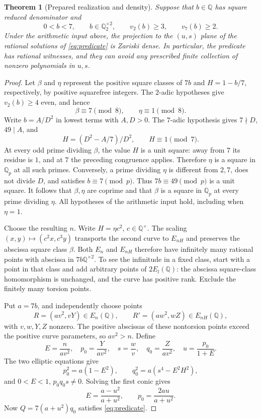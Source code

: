 \documentclass[11pt]{article}
\newtheorem{theorem}{Theorem}
\newcommand{\Q}{\mathbb Q}
\begin{document}
\begin{theorem}[Prepared realization and density]\label{thm:complete}
Suppose that $b\in\Q$ has square reduced denominator and
\[
 0<b<7,\qquad b\in\Q_2^{\times2},\qquad
 v_2(b)\ge3,\qquad v_7(b)\ge2.
\]
Under the arithmetic input above, the projection to the $(u,s)$ plane
of the rational solutions of \eqref{eq:predicate} is Zariski dense.
In particular, the predicate has rational witnesses, and they can
avoid any prescribed finite collection of nonzero polynomials in $u,s$.
\end{theorem}
\begin{proof}
Let $\beta$ and $\eta$ represent the positive square classes of $7b$
and $H=1-b/7$, respectively, by positive squarefree integers.
The $2$-adic hypotheses give $v_2(b)\ge4$ even, and hence
\[
 \beta\equiv7\pmod8,\qquad \eta\equiv1\pmod8.
\]
Write $b=A/D^2$ in lowest terms with $A,D>0$. The $7$-adic hypothesis
gives $7\nmid D$, $49\mid A$, and
\[
 H=(D^2-A/7)/D^2,\qquad H\equiv1\pmod7.
\]
At every odd prime dividing $\beta$, the value $H$ is a unit square:
away from $7$ its residue is $1$, and at $7$ the preceding congruence
applies. Therefore $\eta$ is a square in $\Q_p$ at all such primes.
Conversely, a prime dividing $\eta$ is different from $2,7$, does not
divide $D$, and satisfies $b\equiv7\pmod p$. Thus $7b\equiv49\pmod p$
is a unit square. It follows that $\beta,\eta$ are coprime and that
$\beta$ is a square in $\Q_p$ at every prime dividing $\eta$.
All hypotheses of the arithmetic input hold, including when $\eta=1$.

Choose the resulting $n$. Write $H=\eta c^2$, $c\in\Q^\times$.
The scaling $(x,y)\mapsto(c^2x,c^3y)$ transports the second curve to
$E_{nH}$ and preserves the abscissa square class $\beta$.
Both $E_n$ and $E_{nH}$ therefore have infinitely many rational points
with abscissa in $7b\Q^{\times2}$. To see the infinitude in a fixed
class, start with a point in that class and add arbitrary points of
$2E_l(\Q)$: the abscissa square-class homomorphism is unchanged, and
the curve has positive rank. Exclude the finitely many torsion points.

Put $a=7b$, and independently choose points
\[
 R=(av^2,vY)\in E_n(\Q),\qquad
 R'=(aw^2,wZ)\in E_{nH}(\Q),
\]
with $v,w,Y,Z$ nonzero. The positive abscissas of these nontorsion
points exceed the positive curve parameters, so $av^2>n$.
Define
\[
 E=\frac{n}{av^2},\quad
 p_0=\frac{Y}{av^2},\quad
 s=\frac wv,\quad q_0=\frac Z{av^2},\quad
 u=\frac{p_0}{1+E}.
\]
The two elliptic equations give
\[
 p_0^2=a(1-E^2),\qquad q_0^2=a(s^4-E^2H^2),
\]
and $0<E<1$, $p_0q_0s\ne0$. Solving the first conic gives
\[
 E=\frac{a-u^2}{a+u^2},\qquad
 p_0=\frac{2au}{a+u^2}.
\]
Now $Q=7(a+u^2)q_0$ satisfies \eqref{eq:predicate}.


\end{proof}
\end{document}
